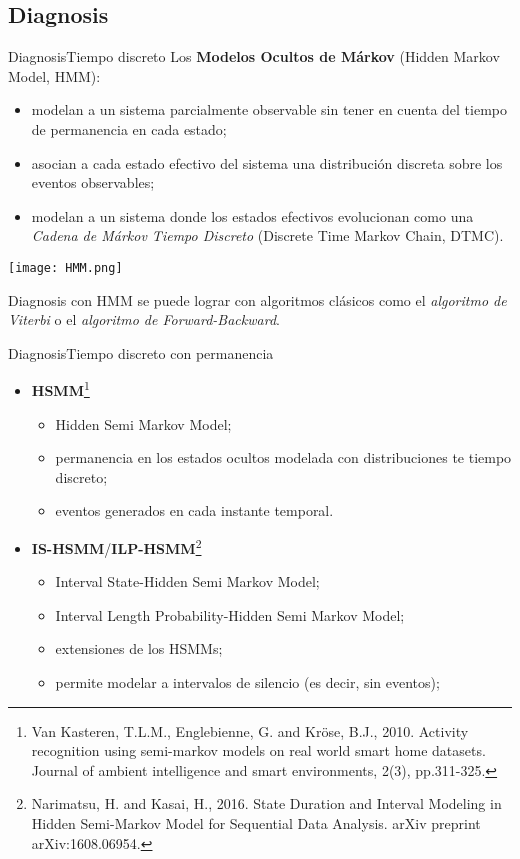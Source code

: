 \documentclass[9pt, handout]{beamer}
\begin{document}
    \subsection{Diagnosis}
      \begin{frame}{Diagnosis}{Tiempo discreto}
        Los \textbf{Modelos Ocultos de Márkov} (Hidden Markov Model, HMM):
        \begin{itemize}
          \item modelan a un sistema parcialmente observable sin tener en cuenta del tiempo de permanencia en cada estado;
          \item asocian a cada estado efectivo del sistema una distribución discreta sobre los eventos observables;
          \item modelan a un sistema donde los estados efectivos evolucionan como una \textit{Cadena de Márkov Tiempo Discreto} (Discrete Time Markov Chain, DTMC).
          
        \end{itemize}
        \begin{center}
          \texttt{[image: HMM.png]}
        \end{center}
        Diagnosis con HMM se puede lograr con algoritmos clásicos como el \textit{algoritmo de Viterbi} o el \textit{algoritmo de Forward-Backward}.
      \end{frame}
      
      \begin{frame}{Diagnosis}{Tiempo discreto con permanencia}
        \begin{itemize}
          \item \textbf{HSMM}\footnote{Van Kasteren, T.L.M., Englebienne, G. and Kröse, B.J., 2010. Activity recognition using semi-markov models on real world smart home datasets. Journal of ambient intelligence and smart environments, 2(3), pp.311-325.}
          \begin{itemize}
            \item Hidden Semi Markov Model;
            \item permanencia en los estados ocultos modelada con distribuciones te tiempo discreto;
            \item eventos generados en cada instante temporal.
          \end{itemize}
          \item \textbf{IS-HSMM}/\textbf{ILP-HSMM}\footnote{Narimatsu, H. and Kasai, H., 2016. State Duration and Interval Modeling in Hidden Semi-Markov Model for Sequential Data Analysis. arXiv preprint arXiv:1608.06954.}
          \begin{itemize}
            \item Interval State-Hidden Semi Markov Model;
            \item Interval Length Probability-Hidden Semi Markov Model;
            \item extensiones de los HSMMs;
            \item permite modelar a intervalos de silencio (es decir, sin eventos);
          \end{itemize}
        \end{itemize}
      \end{frame}
      
\end{document}
